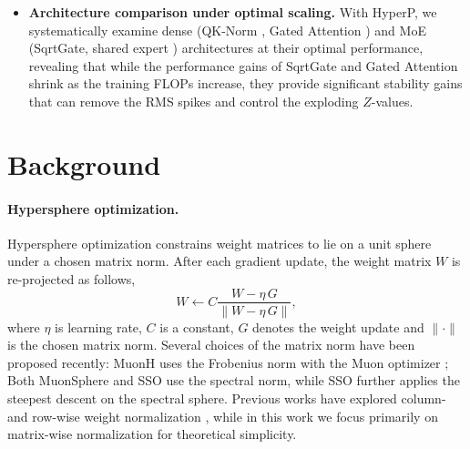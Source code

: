 \documentclass{article}
\begin{document}
\begin{itemize}[leftmargin=1.5em,itemsep=2pt]
    \item \textbf{Architecture comparison under optimal scaling.} With HyperP, we systematically examine dense (QK-Norm \cite{pmlr-v202-dehghani23a}, Gated Attention \cite{qiu2025gated}) and MoE (SqrtGate, shared expert \cite{Dai2024DeepSeekMoETU}) architectures at their optimal performance, revealing that while the performance gains of SqrtGate and Gated Attention shrink as the training FLOPs increase, they provide significant stability gains that can remove the RMS spikes and control the exploding $Z$-values.
\end{itemize}


\section{Background}\label{sec:background}

\paragraph{Hypersphere optimization.}
Hypersphere optimization constrains weight matrices to lie on a unit sphere under a chosen matrix norm. After each gradient update, the weight matrix $W$ is re-projected as follows,
\begin{equation}
W \leftarrow C\frac{W - \eta \, G}{\|W - \eta \, G\|},
\label{eq:hyper_opt}
\end{equation}
where $\eta$ is learning rate, $C$ is a constant, $G$ denotes the weight update and $\|\cdot\|$ is the chosen matrix norm. Several choices of the matrix norm have been proposed recently: MuonH \cite{wen2025hyperball_part1} uses the Frobenius norm with the Muon optimizer \cite{jordan2024muon}; Both MuonSphere \cite{xie2026controlled}  and SSO \cite{xie2026controlled}  use the spectral norm, while SSO further applies the steepest descent on the spectral sphere. Previous works have explored column- and row-wise weight normalization \cite{salimans2016weight,karras2023analyzing,loshchilov2025ngpt, fu2025nemotron0flash0}, while in this work we focus primarily on matrix-wise normalization for theoretical simplicity.
\end{document}
